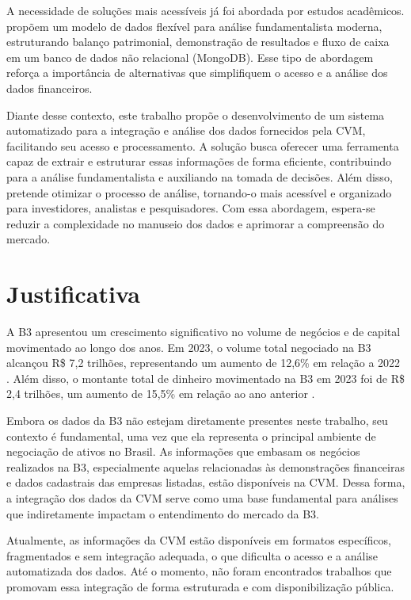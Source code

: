A necessidade de soluções mais acessíveis já foi abordada por estudos acadêmicos. \cite{deAraujo:2021:modeloDados} propõem um modelo de dados flexível para análise fundamentalista moderna, estruturando balanço patrimonial, demonstração de resultados e fluxo de caixa em um banco de dados não relacional (MongoDB). Esse tipo de abordagem reforça a importância de alternativas que simplifiquem o acesso e a análise dos dados financeiros.


Diante desse contexto, este trabalho propõe o desenvolvimento de um sistema automatizado para a integração e análise dos dados fornecidos pela CVM, facilitando seu acesso e processamento. A solução busca oferecer uma ferramenta capaz de extrair e estruturar essas informações de forma eficiente, contribuindo para a análise fundamentalista e auxiliando na tomada de decisões. Além disso, pretende otimizar o processo de análise, tornando-o mais acessível e organizado para investidores, analistas e pesquisadores. Com essa abordagem, espera-se reduzir a complexidade no manuseio dos dados e aprimorar a compreensão do mercado.

\section{Justificativa}\label{sec:justificativa}
A B3 apresentou um crescimento significativo no volume de negócios e de capital movimentado ao longo dos anos. Em 2023, o volume total negociado na B3 alcançou R\$ 7,2 trilhões, representando um aumento de 12,6\% em relação a 2022 \cite{b3:2023:investidores}. Além disso, o montante total de dinheiro movimentado na B3 em 2023 foi de R\$ 2,4 trilhões, um aumento de 15,5\% em relação ao ano anterior \cite{b3:2023:investidores}.

Embora os dados da B3 não estejam diretamente presentes neste trabalho, seu contexto é fundamental, uma vez que ela representa o principal ambiente de negociação de ativos no Brasil. As informações que embasam os negócios realizados na B3, especialmente aquelas relacionadas às demonstrações financeiras e dados cadastrais das empresas listadas, estão disponíveis na CVM. Dessa forma, a integração dos dados da CVM serve como uma base fundamental para análises que indiretamente impactam o entendimento do mercado da B3.

Atualmente, as informações da CVM estão disponíveis em formatos específicos, fragmentados e sem integração adequada, o que dificulta o acesso e a análise automatizada dos dados. Até o momento, não foram encontrados trabalhos que promovam essa integração de forma estruturada e com disponibilização pública.


